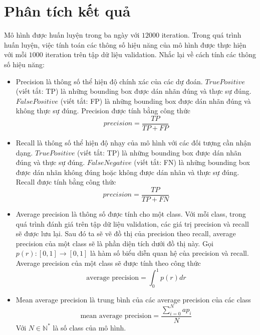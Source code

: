 \chapter{Phân tích kết quả}
Mô hình được huấn luyện trong ba ngày với $12000$ iteration. Trong quá trình huấn luyện, việc tính toán các thông số hiệu năng của mô hình được thực hiện với mỗi $1000$ iteration trên tập dữ liệu validation. 
Nhắc lại về cách tính các thông số hiệu năng:
\begin{itemize}
	\item Precision là thông số thể hiện độ chính xác của các dự đoán. $True Positive$ (viết tắt: TP) là những bounding box được dán nhãn đúng và thực sự đúng. $False Positive$ (viết tắt: FP) là những bounding box được dán nhãn đúng và không thực sự đúng. Precision được tính bằng công thức
	\begin{equation}
		precision = \frac{TP}{TP+FP}
	\end{equation}
	\item Recall là thông số thể hiện độ nhạy của mô hình với các đối tượng cần nhận dạng. $True Positive$ (viết tắt: TP) là những bounding box được dán nhãn đúng và thực sự đúng. $False Negative$ (viết tắt: FN) là những bounding box được dán nhãn không đúng hoặc không được dán nhãn và thực sự đúng. Recall được tính bằng công thức
	\begin{equation}
		precision = \frac{TP}{TP+FN}
	\end{equation}
	\item Average precision là thông số được tính cho một class. Với mỗi class, trong quá trình đánh giá trên tập dữ liệu validation, các giá trị precision và recall sẽ được lưu lại. Sau đó ta sẽ vẽ đồ thị của precision theo recall, average precision của một class sẽ là phần diện tích dưới đồ thị này. Gọi $p(r):[0,1]\rightarrow[0,1]$ là hàm số biểu diễn quan hệ của precision và recall. Average precision của một class sẽ được tính theo công thức
	\begin{equation}
		\text{average precision} = \int_{0}^{1} p(r) dr
	\end{equation}
	\item Mean average precision là trung bình của các average precision của các class
	\begin{equation}
		\text{mean average precision} = \frac{\sum_{i=0}^{N} ap_i}{N}
	\end{equation}
	Với $N \in \mathbb{N}^*$ là số class của mô hình.
\end{itemize}

